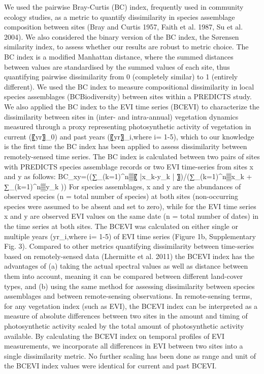 We used the pairwise Bray-Curtis (BC) index, frequently used in community ecology studies, as a metric to quantify dissimilarity in species assemblage composition between sites (Bray and Curtis 1957, Faith et al. 1987, Su et al. 2004). We also considered the binary version of the BC index, the Sørensen similarity index, to assess whether our results are robust to metric choice. The BC index is a modified Manhattan distance, where the summed distances between values are standardised by the summed values of each site, thus quantifying pairwise dissimilarity from 0 (completely similar) to 1 (entirely different). We used the BC index to measure compositional dissimilarity in local species assemblages (BCBiodiversity) between sites within a PREDICTS study. We also applied the BC index to the EVI time series (BCEVI) to characterize the dissimilarity between sites in (inter- and intra-annual) vegetation dynamics measured through a proxy representing photosynthetic activity of vegetation in current (〖yr〗_0) and past years (〖yr〗_i,where i= 1-5), which to our knowledge is the first time the BC index has been applied to assess dissimilarity between remotely-sensed time series.
	The BC index is calculated between two pairs of sites with PREDICTS species assemblage records or two EVI time-series from sites x and y as follows: 
BC_xy=((∑_(k=1)^n▒〖 |x_k-y_k  | 〗)/(∑_(k=1)^n▒x_k + ∑_(k=1)^n▒y_k ))
For species assemblages, x and y are the abundances of observed species (n = total number of species) at both sites (non-occurring species were assumed to be absent and set to zero), while for the EVI time series x and y are observed EVI values on the same date (n = total number of dates) in the time series at both sites. The BCEVI was calculated on either single or multiple years (yr_i,where i= 1-5) of EVI time series (Figure 1b, Supplementary Fig. 3).
	Compared to other metrics quantifying dissimilarity between time-series based on remotely-sensed data (Lhermitte et al. 2011) the BCEVI index has the advantages of (a) taking the actual spectral values as well as distance between them into account, meaning it can be compared between different land-cover types, and (b) using the same method for assessing dissimilarity between species assemblages and between remote-sensing observations. In remote-sensing terms, for any vegetation index (such as EVI), the BCEVI index can be interpreted as a measure of absolute differences between two sites in the amount and timing of photosynthetic activity scaled by the total amount of photosynthetic activity available. By calculating the BCEVI index on temporal profiles of EVI measurements, we incorporate all differences in EVI between two sites into a single dissimilarity metric. No further scaling has been done as range and unit of the BCEVI index values were identical for current and past BCEVI.

